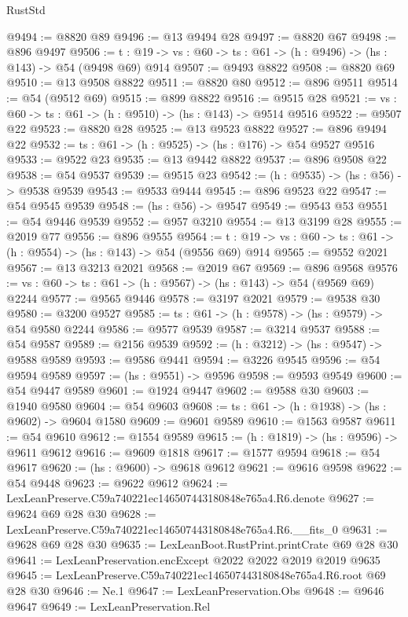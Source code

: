 \begin{lexlean}{RustStd}
\begin{coremodule}
@9494 := @8820 @89
@9496 := @13 @9494 @28
@9497 := @8820 @67
@9498 := @896 @9497
@9506 := {t : @19} -> {vs : @60} -> {ts : @61} -> (h : @9496) -> (hs : @143) -> @54 (@9498 @69) @914
@9507 := @9493 @8822
@9508 := @8820 @69
@9510 := @13 @9508 @8822
@9511 := @8820 @80
@9512 := @896 @9511
@9514 := @54 (@9512 @69)
@9515 := @899 @8822
@9516 := @9515 @28
@9521 := {vs : @60} -> {ts : @61} -> (h : @9510) -> (hs : @143) -> @9514 @9516
@9522 := @9507 @22
@9523 := @8820 @28
@9525 := @13 @9523 @8822
@9527 := @896 @9494 @22
@9532 := {ts : @61} -> (h : @9525) -> (hs : @176) -> @54 @9527 @9516
@9533 := @9522 @23
@9535 := @13 @9442 @8822
@9537 := @896 @9508 @22
@9538 := @54 @9537
@9539 := @9515 @23
@9542 := (h : @9535) -> (hs : @56) -> @9538 @9539
@9543 := @9533 @9444
@9545 := @896 @9523 @22
@9547 := @54 @9545 @9539
@9548 := (hs : @56) -> @9547
@9549 := @9543 @53
@9551 := @54 @9446 @9539
@9552 := @957 @3210
@9554 := @13 @3199 @28
@9555 := @2019 @77
@9556 := @896 @9555
@9564 := {t : @19} -> {vs : @60} -> {ts : @61} -> (h : @9554) -> (hs : @143) -> @54 (@9556 @69) @914
@9565 := @9552 @2021
@9567 := @13 @3213 @2021
@9568 := @2019 @67
@9569 := @896 @9568
@9576 := {vs : @60} -> {ts : @61} -> (h : @9567) -> (hs : @143) -> @54 (@9569 @69) @2244
@9577 := @9565 @9446
@9578 := @3197 @2021
@9579 := @9538 @30
@9580 := @3200 @9527
@9585 := {ts : @61} -> (h : @9578) -> (hs : @9579) -> @54 @9580 @2244
@9586 := @9577 @9539
@9587 := @3214 @9537
@9588 := @54 @9587
@9589 := @2156 @9539
@9592 := (h : @3212) -> (hs : @9547) -> @9588 @9589
@9593 := @9586 @9441
@9594 := @3226 @9545
@9596 := @54 @9594 @9589
@9597 := (hs : @9551) -> @9596
@9598 := @9593 @9549
@9600 := @54 @9447 @9589
@9601 := @1924 @9447
@9602 := @9588 @30
@9603 := @1940 @9580
@9604 := @54 @9603
@9608 := {ts : @61} -> (h : @1938) -> (hs : @9602) -> @9604 @1580
@9609 := @9601 @9589
@9610 := @1563 @9587
@9611 := @54 @9610
@9612 := @1554 @9589
@9615 := (h : @1819) -> (hs : @9596) -> @9611 @9612
@9616 := @9609 @1818
@9617 := @1577 @9594
@9618 := @54 @9617
@9620 := (hs : @9600) -> @9618 @9612
@9621 := @9616 @9598
@9622 := @54 @9448
@9623 := @9622 @9612
@9624 := LexLeanPreserve.C59a740221ec146507443180848e765a4.R6.denote
@9627 := @9624 @69 @28 @30
@9628 := LexLeanPreserve.C59a740221ec146507443180848e765a4.R6.__fits_0
@9631 := @9628 @69 @28 @30
@9635 := LexLeanBoot.RustPrint.printCrate @69 @28 @30
@9641 := LexLeanPreservation.encExcept @2022 @2022 @2019 @2019 @9635
@9645 := LexLeanPreserve.C59a740221ec146507443180848e765a4.R6.root @69 @28 @30
@9646 := Ne.{1}
@9647 := LexLeanPreservation.Obs
@9648 := @9646 @9647
@9649 := LexLeanPreservation.Rel

\end{coremodule}
\end{lexlean}
